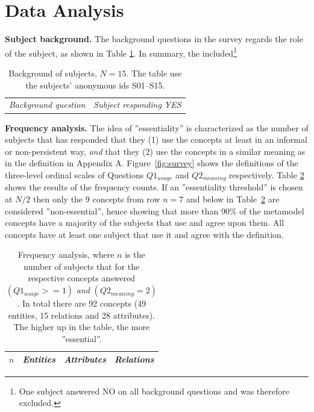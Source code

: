 \documentclass[a4paper]{llncs}
\begin{document}
\section{Data Analysis}

\textbf{Subject background.} The background questions in the survey regards the role of the subject, as shown in Table \ref{table:background}. In summary, the included\footnote{One subject answered NO on all background questions and was therefore excluded.} 
\begin{table}[H]
\centering
\fontsize{8}{9}\selectfont
\caption{Background of subjects, $N = 15$. The table use the subjects' anonymous ids S01--S15.}
\label{table:background}
\begin{tabular}{p{}| p{}}
\textit{Background question} & \textit{Subject responding YES}  \\ 


 \end{tabular}
\end{table}



\noindent \textbf{Frequency analysis.} The idea of ''essentiality'' is characterized as the number of subjects that has responded that they (1) use the concepts at least in an informal or non-persistent way, \textit{and} that they (2) use the concepts in a similar meaning as in the definition in Appendix A. Figure~\ref{fig:survey} shows the definitions of the three-level ordinal scales of Questions $Q1_{usage}$  and $Q2_{meaning}$ respectively. Table \ref{table:frequency} shows the results of the frequency counts.  
If an ''essentiality threshold'' is chosen at $N/2$ then only the $9$ concepts from row $n = 7$ and below in Table~\ref{table:frequency} are considered ''non-essential'', hence showing that more than 90\% of the metamodel concepts have a majority of the subjects that use and agree upon them. All concepts have at least one subject that use it and agree with the definition.

%
\begingroup
\setlength{\tabcolsep}{4pt} %
\renewcommand{\arraystretch}{1.2} %
\begin{table}
\centering
\fontsize{7}{8}\selectfont
\caption{Frequency analysis, where $n$ is the number of subjects that for the respective concepts answered $(Q1_{usage}>= 1)$ \textit{and} $(Q2_{meaning} = 2)$. In total there are 92 concepts (49 entities, 15 relations and 28 attributes). The higher up in the table, the more ''essential''.}
\label{table:frequency}
\begin{tabular}{l | p{} | p{} | p{}}
\textit{$n$} & \textit{Entities} & \textit{Attributes} & \textit{Relations} \\ \hline

 \end{tabular}
\end{table}
\endgroup
\end{document}
